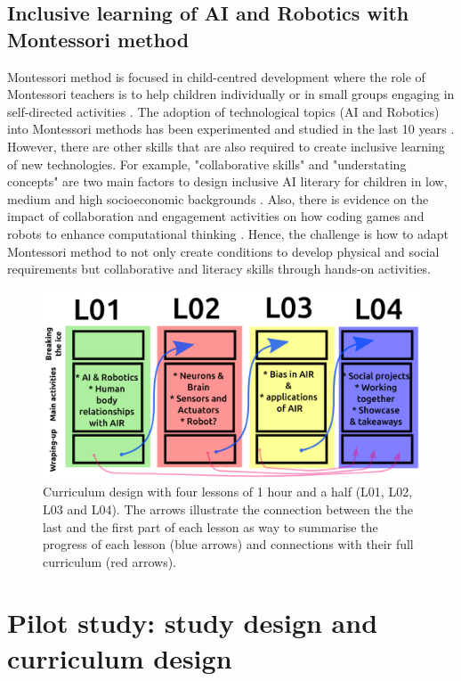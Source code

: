 \documentclass[sigconf]{acmart}
\begin{document}
\subsection{Inclusive learning of AI and Robotics with Montessori method}
Montessori method is focused in child-centred development where the role of Montessori teachers is to help children individually or in small groups engaging in self-directed activities \cite{Aljabreen2020}.
The adoption of technological topics (AI and Robotics) into Montessori methods has been experimented and studied in the last 10 years \cite{elkin2014}. 
However, there are other skills that are also required to create inclusive learning of new technologies. For example, "collaborative skills" and "understating concepts" are two main factors to design inclusive AI literary for children in low, medium and high socioeconomic backgrounds \cite{druga2019}. 
Also, there is evidence on the impact of collaboration and engagement activities on how coding games and robots to enhance computational thinking \cite{sharma2019}.
Hence, the challenge is how to adapt Montessori method to not only create conditions to develop physical and social requirements but collaborative and literacy skills through hands-on activities. 

\begin{figure}[t]
  \centering
    \includegraphics[width=\linewidth]{../figures/curriculum/outputs/drawing-v02.png}  %
    \caption{
    Curriculum design with four lessons of 1 hour and a half (L01, L02, L03 and L04).
    The arrows illustrate the connection between the the last and the first part of each lesson as way to summarise the progress of each lesson (blue arrows) and connections with their full curriculum (red arrows).
    }
    \label{fig:curriculum}
\end{figure}
\section{Pilot study: study design and curriculum design}
\end{document}
